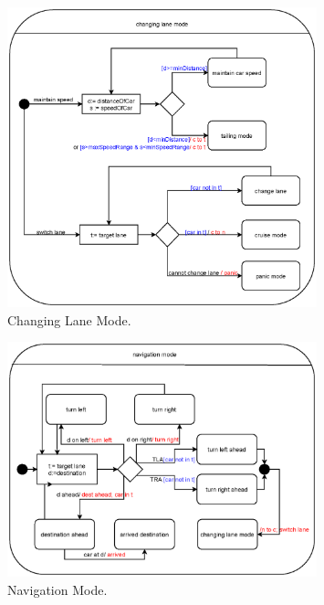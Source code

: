 \documentclass[12pt]{article}
\begin{document}
\begin{spacing}{1.5}
\begin{figure}[h!]
	\centering
		\includegraphics[width=0.8\textwidth]{./A2_Figures/A2_SOEN331_Changing_Lane.eps}
		  \caption{Changing Lane Mode.}
  \label{fig:changing-lane-mode-fig}
\end{figure}

\begin{figure}[h!]
	\centering
		\includegraphics[width=0.8\textwidth]{./A2_Figures/A2_SOEN331_Navigation.eps}
		  \caption{Navigation Mode.}
  \label{fig:navigation-mode-fig}
\end{figure}

\end{spacing}
\end{document}
